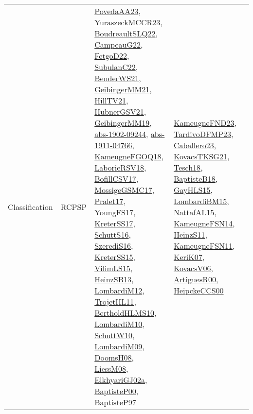 {\begin{longtable}{lp{3cm}>{\raggedright}p{6cm}>{\raggedright}p{6cm}p{8cm}}
Classification & RCPSP & \href{papers/PovedaAA23.pdf}{PovedaAA23}\cite{PovedaAA23}, \href{articles/YuraszeckMCCR23.pdf}{YuraszeckMCCR23}\cite{YuraszeckMCCR23}, \href{papers/BoudreaultSLQ22.pdf}{BoudreaultSLQ22}\cite{BoudreaultSLQ22}, \href{articles/CampeauG22.pdf}{CampeauG22}\cite{CampeauG22}, \href{articles/FetgoD22.pdf}{FetgoD22}\cite{FetgoD22}, \href{articles/SubulanC22.pdf}{SubulanC22}\cite{SubulanC22}, \href{papers/BenderWS21.pdf}{BenderWS21}\cite{BenderWS21}, \href{papers/GeibingerMM21.pdf}{GeibingerMM21}\cite{GeibingerMM21}, \href{papers/HillTV21.pdf}{HillTV21}\cite{HillTV21}, \href{articles/HubnerGSV21.pdf}{HubnerGSV21}\cite{HubnerGSV21}, \href{papers/GeibingerMM19.pdf}{GeibingerMM19}\cite{GeibingerMM19}, \href{articles/abs-1902-09244.pdf}{abs-1902-09244}\cite{abs-1902-09244}, \href{articles/abs-1911-04766.pdf}{abs-1911-04766}\cite{abs-1911-04766}, \href{papers/KameugneFGOQ18.pdf}{KameugneFGOQ18}\cite{KameugneFGOQ18}, \href{articles/LaborieRSV18.pdf}{LaborieRSV18}\cite{LaborieRSV18}, \href{papers/BofillCSV17.pdf}{BofillCSV17}\cite{BofillCSV17}, \href{papers/MossigeGSMC17.pdf}{MossigeGSMC17}\cite{MossigeGSMC17}, \href{papers/Pralet17.pdf}{Pralet17}\cite{Pralet17}, \href{papers/YoungFS17.pdf}{YoungFS17}\cite{YoungFS17}, \href{articles/KreterSS17.pdf}{KreterSS17}\cite{KreterSS17}, \href{papers/SchuttS16.pdf}{SchuttS16}\cite{SchuttS16}, \href{papers/SzerediS16.pdf}{SzerediS16}\cite{SzerediS16}, \href{papers/KreterSS15.pdf}{KreterSS15}\cite{KreterSS15}, \href{papers/VilimLS15.pdf}{VilimLS15}\cite{VilimLS15}, \href{articles/HeinzSB13.pdf}{HeinzSB13}\cite{HeinzSB13}, \href{articles/LombardiM12.pdf}{LombardiM12}\cite{LombardiM12}, \href{articles/TrojetHL11.pdf}{TrojetHL11}\cite{TrojetHL11}, \href{papers/BertholdHLMS10.pdf}{BertholdHLMS10}\cite{BertholdHLMS10}, \href{papers/LombardiM10.pdf}{LombardiM10}\cite{LombardiM10}, \href{papers/SchuttW10.pdf}{SchuttW10}\cite{SchuttW10}, \href{papers/LombardiM09.pdf}{LombardiM09}\cite{LombardiM09}, \href{papers/DoomsH08.pdf}{DoomsH08}\cite{DoomsH08}, \href{articles/LiessM08.pdf}{LiessM08}\cite{LiessM08}, \href{papers/ElkhyariGJ02a.pdf}{ElkhyariGJ02a}\cite{ElkhyariGJ02a}, \href{articles/BaptisteP00.pdf}{BaptisteP00}\cite{BaptisteP00}, \href{papers/BaptisteP97.pdf}{BaptisteP97}\cite{BaptisteP97} & \href{papers/KameugneFND23.pdf}{KameugneFND23}\cite{KameugneFND23}, \href{papers/TardivoDFMP23.pdf}{TardivoDFMP23}\cite{TardivoDFMP23}, \href{articles/Caballero23.pdf}{Caballero23}\cite{Caballero23}, \href{papers/KovacsTKSG21.pdf}{KovacsTKSG21}\cite{KovacsTKSG21}, \href{papers/Tesch18.pdf}{Tesch18}\cite{Tesch18}, \href{articles/BaptisteB18.pdf}{BaptisteB18}\cite{BaptisteB18}, \href{papers/GayHLS15.pdf}{GayHLS15}\cite{GayHLS15}, \href{papers/LombardiBM15.pdf}{LombardiBM15}\cite{LombardiBM15}, \href{articles/NattafAL15.pdf}{NattafAL15}\cite{NattafAL15}, \href{articles/KameugneFSN14.pdf}{KameugneFSN14}\cite{KameugneFSN14}, \href{papers/HeinzS11.pdf}{HeinzS11}\cite{HeinzS11}, \href{papers/KameugneFSN11.pdf}{KameugneFSN11}\cite{KameugneFSN11}, \href{papers/KeriK07.pdf}{KeriK07}\cite{KeriK07}, \href{papers/KovacsV06.pdf}{KovacsV06}\cite{KovacsV06}, \href{articles/ArtiguesR00.pdf}{ArtiguesR00}\cite{ArtiguesR00}, \href{articles/HeipckeCCS00.pdf}{HeipckeCCS00}\cite{HeipckeCCS00} 
\end{longtable}}
